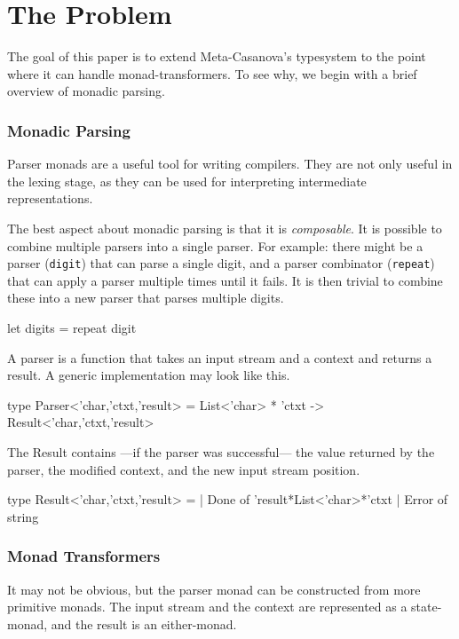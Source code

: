 \section{The Problem}
\begin{multicols}{2}\noindent
  The goal of this paper is to extend Meta-Casanova's typesystem to the point where it can handle monad-transformers.
  To see why, we begin with a brief overview of monadic parsing.
  
  \subsubsection*{Monadic Parsing}
  Parser monads are a useful tool for writing compilers.
  They are not only useful in the lexing stage,
  as they can be used for interpreting intermediate representations.

  The best aspect about monadic parsing is that it is \textit{composable}.
  It is possible to combine multiple parsers into a single parser.
  For example: there might be a parser (\texttt{digit}) that can parse a single digit,
  and a parser combinator (\texttt{repeat}) that can apply a parser multiple times until it fails.
  It is then trivial to combine these into a new parser that parses multiple digits.

  \begin{code}[language=Caml]
  let digits = repeat digit
  \end{code}

  A parser is a function that takes an input stream and a context and returns a result.
  A generic implementation may look like this.

  \begin{code}[language=Caml]
  type Parser<'char,'ctxt,'result> =
    List<'char> * 'ctxt
      -> Result<'char,'ctxt,'result>
  \end{code}
  
  The Result contains ---if the parser was successful--- the value returned by the parser, the modified context, and the new input stream position.
  
  \begin{code}[language=Caml]
  type Result<'char,'ctxt,'result> = 
    | Done  of 'result*List<'char>*'ctxt
    | Error of string
  \end{code}

  \subsubsection*{Monad Transformers}
  It may not be obvious, but the parser monad can be constructed from more primitive monads.
  The input stream and the context are represented as a state-monad, and the result is an either-monad.


\end{multicols}
